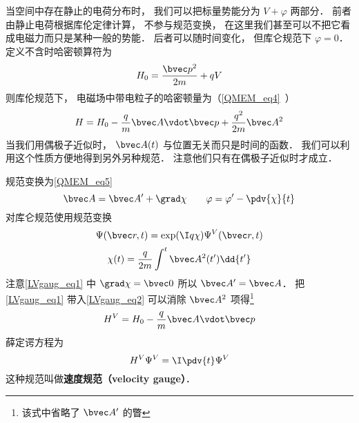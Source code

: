 

当空间中存在静止的电荷分布时， 我们可以把标量势能分为 $V + \varphi$ 两部分． 前者由静止电荷根据库伦定律计算， 不参与规范变换， 在这里我们甚至可以不把它看成电磁力而只是某种一般的势能． 后者可以随时间变化， 但库仑规范下 $\varphi = 0$． 定义不含时哈密顿算符为
\begin{equation}
H_0 = \frac{\bvec p^2}{2m} + qV
\end{equation}
则库伦规范下， 电磁场中带电粒子的哈密顿量为（\autoref{QMEM_eq4}~）
\begin{equation}\label{LVgaug_eq2}
H = H_0 - \frac{q}{m} \bvec A \vdot \bvec p + \frac{q^2}{2m} \bvec A^2
\end{equation}
当我们用偶极子近似时， $\bvec A(t)$ 与位置无关而只是时间的函数． 我们可以利用这个性质方便地得到另外另种规范． 注意他们只有在偶极子近似时才成立．

规范变换为\autoref{QMEM_eq5}~
\begin{equation}\label{LVgaug_eq1}
\bvec A = \bvec A' + \grad \chi
\qquad
\varphi = \varphi' - \pdv{\chi}{t}
\end{equation}
对库仑规范使用规范变换
\begin{equation}\label{LVgaug_eq3}
\Psi(\bvec r, t) = \exp(\I q\chi)\Psi^V(\bvec r, t)
\end{equation}
\begin{equation}\label{LVgaug_eq4}
\chi(t) = \frac{q}{2m} \int^t \bvec A^2(t') \dd{t'}
\end{equation}
注意\autoref{LVgaug_eq1} 中 $\grad \chi = \bvec 0$ 所以 $\bvec A' = \bvec A$． 把\autoref{LVgaug_eq1} 带入\autoref{LVgaug_eq2} 可以消除 $\bvec A^2$ 项得\footnote{该式中省略了 $\bvec A'$ 的瞥}
\begin{equation}
H^V = H_0 - \frac{q}{m} \bvec A \vdot \bvec p
\end{equation}
薛定谔方程为
\begin{equation}
H^V \Psi^V = \I \pdv{t} \Psi^V
\end{equation}
这种规范叫做\textbf{速度规范（velocity gauge）}．

